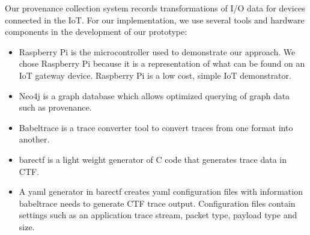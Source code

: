 \documentclass[conference]{IEEEtran}
\begin{document}
Our provenance collection system records transformations of I/O data for devices connected in the IoT. For our implementation, we use several tools and hardware components in the development of our prototype:

\begin{itemize}
\item Raspberry Pi is the microcontroller used to demonstrate our approach. We chose Raspberry Pi because it is a representation of what can be found on an IoT gateway device. Raspberry Pi is a low cost, simple IoT demonstrator.


\item Neo4j is a graph database which allows optimized querying of graph data such as provenance.


\item Babeltrace is a trace converter tool to convert traces from one format into another. 

\item barectf is a light weight generator of C code  that generates trace data in CTF. 

\item  A yaml generator in barectf creates yaml  configuration files with information babeltrace needs to generate CTF trace output. Configuration  files contain settings such as an application trace stream, packet type, payload type and size. 


\end{itemize}

%
%
%
\end{document}
